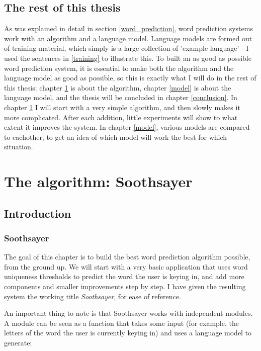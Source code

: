 \documentclass[12pt]{article}
\let\stdsection\section
\renewcommand\section{\newpage\stdsection}
\begin{document}
\subsection{The rest of this thesis} \label{restofthisthesis}
As was explained in detail in section \ref{word_prediction}, word prediction systems work with an algorithm and a language model. Language models are formed out of training material, which simply is a large collection of 'example language' - I used the sentences in \ref{training} to illustrate this. To built an as good as possible word prediction system, it is essential to make both the algorithm and the language model as good as possible, so this is exactly what I will do in the rest of this thesis: chapter \ref{algorithm} is about the algorithm, chapter \ref{model} is about the language model, and the thesis will be concluded in chapter \ref{conclusion}. In chapter \ref{algorithm} I will start with a very simple algorithm, and then slowly makes it more complicated. After each addition, little experiments will show to what extent it improves the system. In chapter \ref{model}, various models are compared to eachother, to get an idea of which model will work the best for which situation. 





\section{The algorithm: Soothsayer} \label{algorithm}

\subsection{Introduction}

\subsubsection{Soothsayer} \label{ss_intro}
The goal of this chapter is to build the best word prediction algorithm possible, from the ground up. We will start with a very basic application that uses word uniqueness thresholds to predict the word the user is keying in, and add more components and smaller improvements step by step. I have given the resulting system the working title \emph{Soothsayer}, for ease of reference.

An important thing to note is that Soothsayer works with independent modules. A module can be seen as a function that takes some input (for example, the letters of the word the user is currently keying in) and uses a language model to generate:
\end{document}
